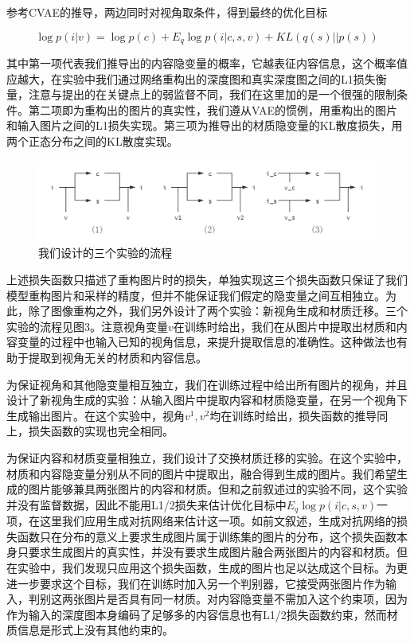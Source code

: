 \documentclass[UTF8,openany,AutoFakeBold,AutoFakeSlant,cs4size]{ctexbook}
\begin{document}
参考CVAE的推导，两边同时对视角取条件，得到最终的优化目标

\begin{equation}
	\log p(i | v)= \log p(c) + E_{q} \log p(i | c, s, v) + KL(q(s) || p(s))
\end{equation}

其中第一项代表我们推导出的内容隐变量的概率，它越表征内容信息，这个概率值应越大，在实验中我们通过网络重构出的深度图和真实深度图之间的L1损失衡量，注意与\cite{Wu2019DisentanglingCA}提出的在关键点上的弱监督不同，我们在这里加的是一个很强的限制条件。第二项即为重构出的图片的真实性，我们遵从VAE的惯例，用重构出的图片和输入图片之间的L1损失实现。第三项为推导出的材质隐变量的KL散度损失，用两个正态分布之间的KL散度实现。

\begin{figure}
\centering
\includegraphics[width=15cm]{./images/my_model.png}
\caption{我们设计的三个实验的流程}
\label{fig:sample}
\end{figure}

上述损失函数只描述了重构图片时的损失，单独实现这三个损失函数只保证了我们模型重构图片和采样的精度，但并不能保证我们假定的隐变量之间互相独立。为此，除了图像重构之外，我们另外设计了两个实验：新视角生成和材质迁移。三个实验的流程见图3。注意视角变量$v$在训练时给出，我们在从图片中提取出材质和内容变量的过程中也输入已知的视角信息，来提升提取信息的准确性。这种做法也有助于提取到视角无关的材质和内容信息。

为保证视角和其他隐变量相互独立，我们在训练过程中给出所有图片的视角，并且设计了新视角生成的实验：从输入图片中提取内容和材质隐变量，在另一个视角下生成输出图片。在这个实验中，视角$v^{1}, v^{2}​$均在训练时给出，损失函数的推导同上，损失函数的实现也完全相同。

为保证内容和材质变量相独立，我们设计了交换材质迁移的实验。在这个实验中，材质和内容隐变量分别从不同的图片中提取出，融合得到生成的图片。我们希望生成的图片能够兼具两张图片的内容和材质。但和之前叙述过的实验不同，这个实验并没有监督数据，因此不能用L1/2损失来估计优化目标中$E_{q} \log p(i | c, s, v)$一项，在这里我们应用生成对抗网络来估计这一项。如前文叙述，生成对抗网络的损失函数只在分布的意义上要求生成图片属于训练集的图片的分布，这个损失函数本身只要求生成图片的真实性，并没有要求生成图片融合两张图片的内容和材质。但在实验中，我们发现只应用这个损失函数，生成的图片也足以达成这个目标。为更进一步要求这个目标，我们在训练时加入另一个判别器，它接受两张图片作为输入，判别这两张图片是否具有同一材质。对内容隐变量不需加入这个约束项，因为作为输入的深度图本身编码了足够多的内容信息也有L1/2损失函数约束，然而材质信息是形式上没有其他约束的。
\end{document}
